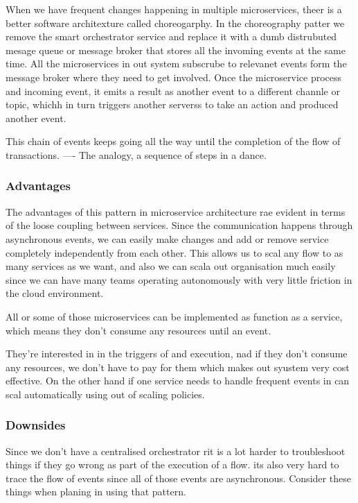 \documentclass[a4paper, 11pt]{book}
\begin{document}
{    When we have frequent changes happening in multiple microservices, theer is a better software architexture called choreogarphy.
    In the choreography patter we remove the smart orchestrator service and replace it with a dumb distrubuted mesage queue or message broker that stores all the invoming events at the same time.
    All the microservices in out system subscrube to relevanet events form the message broker where they need to get involved.
    Once the microservice process and incoming event, it emits a result as another event to a different channle or topic, whichh in turn triggers another serverss to take an action and produced another event.

    This chain of events keeps going all the way until the completion of the flow of transactions.
    ---- The analogy, a sequence of steps in a dance.

    \subsubsection{Advantages}
    The advantages of this pattern in microservice architecture rae evident in terms of the loose coupling between services.
    Since the communication happens through asynchronous events, we can easily make changes and add or remove service completely independently from each other.
    This allows us to scal any flow to as many services as we want, and also we can scala out organisation much easily since we can have many teams operating autonomously with very little friction in the cloud environment.

    All or some of those microservices can be implemented as function as a service, which means they don't consume any resources until an event.

    They're interested in in the triggers of and execution, nad if they don't consume any resources, we don't have to pay for them which makes out syustem very cost effective.
    On the other hand if one service needs to handle frequent events in can scal automatically using out of scaling policies.

    \subsubsection{Downsides}
    Since we don't have a centralised orchestrator rit is a lot harder to troubleshoot things if they go wrong as part of the execution of a flow.
    its also very hard to trace the flow of events since all of those events are asynchronous.
    Consider these things when planing in using that pattern.

}
\end{document}
